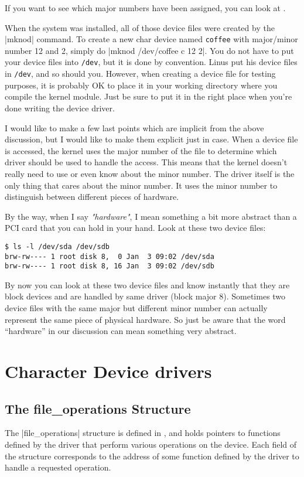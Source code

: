 \documentclass[10pt, oneside]{book}
\begin{document}
If you want to see which major numbers have been assigned, you can look at .

When the system was installed, all of those device files were created by the \sh|mknod| command.
To create a new char device named \verb|coffee| with major/minor number 12 and 2, simply do \sh|mknod /dev/coffee c 12 2|.
You do not have to put your device files into \verb|/dev|, but it is done by convention.
Linus put his device files in \verb|/dev|, and so should you.
However, when creating a device file for testing purposes, it is probably OK to place it in your working directory where you compile the kernel module.
Just be sure to put it in the right place when you're done writing the device driver.

I would like to make a few last points which are implicit from the above discussion, but I would like to make them explicit just in case.
When a device file is accessed, the kernel uses the major number of the file to determine which driver should be used to handle the access.
This means that the kernel doesn't really need to use or even know about the minor number.
The driver itself is the only thing that cares about the minor number.
It uses the minor number to distinguish between different pieces of hardware.

By the way, when I say \emph{"hardware"}, I mean something a bit more abstract than a PCI card that you can hold in your hand.
Look at these two device files:

\begin{verbatim}
$ ls -l /dev/sda /dev/sdb
brw-rw---- 1 root disk 8,  0 Jan  3 09:02 /dev/sda
brw-rw---- 1 root disk 8, 16 Jan  3 09:02 /dev/sdb
\end{verbatim}

By now you can look at these two device files and know instantly that they are block devices and are handled by same driver (block major 8).
Sometimes two device files with the same major but different minor number can actually represent the same piece of physical hardware.
So just be aware that the word ``hardware'' in our discussion can mean something very abstract.

\section{Character Device drivers}
\label{sec:chardev}
\subsection{The file\_operations Structure}
\label{sec:file_operations}
The \cpp|file_operations| structure is defined in , and holds pointers to functions defined by the driver that perform various operations on the device.
Each field of the structure corresponds to the address of some function defined by the driver to handle a requested operation.
\end{document}

